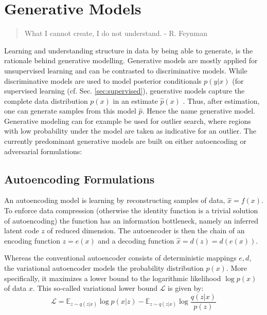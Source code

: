 \section{Generative Models}\label{sec:genmodel}
	\begin{quote}
	    What I cannot create, I do not understand. - R. Feynman
	\end{quote}
	Learning and understanding structure in data by being able to generate, is the rationale behind generative modelling.
	Generative models are mostly applied for unsupervised learning and can be contrasted to discriminative models. While discriminative models are used to model posterior conditionals $p(y|x)$ (\eg for supervised learning (cf. Sec. \ref{sec:supervised}), generative models capture the complete data distribution $p(x)$ in an estimate $\hat p(x)$ \cite{bishop06pattern}. Thus, after estimation, one can generate samples from this model $\hat p$. Hence the name generative model.
	Generative modeling can for example be used for outlier search, where regions with low probability under the model are taken as indicative for an outlier.
	The currently predominant generative models are built on either autoencoding or adversarial formulations:

	\subsection{Autoencoding Formulations}\label{sec:autoencoding}
		An autoencoding model is learning by reconstructing samples of data, $\hat x = f(x)$. To enforce data compression (otherwise the identity function is a trivial solution of autoencoding) the function has an information bottleneck, namely an inferred latent code $z$ of reduced dimension. The autoencoder is then the chain of an encoding function $z = e(x)$ and a decoding function $\hat x = d(z) = d(e(x))$. 

		Whereas the conventional autoencoder consists of deterministic mappings $e, d$, the {variational autoencoder} \cite{kingma13vae} models the probability distribution $p(x)$. More specifically, it maximizes a lower bound to the logarithmic likelihood $\log p(x)$ of data $x$. This so-called variational lower bound $\mathcal{L}$ is given by:
		\begin{equation}\label{eq:vae}
			\mathcal{L} = \mathds{E}_{z\sim q(z|x)}  \log p(x|z) - \mathds{E}_{z\sim q(z|x)} \log \frac{q(z|x)}{p(z)}
		\end{equation}

